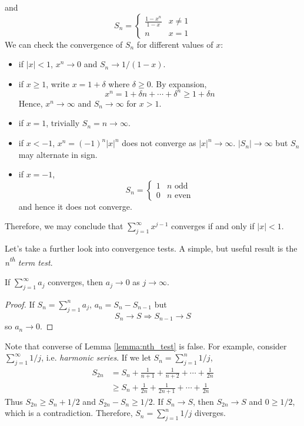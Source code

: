 \documentclass[10pt, a4paper, twoside]{report}
\begin{document}
and 
\[S_n=\begin{cases}
    \frac{1-x^n}{1-x} & x\neq 1 \\
    n & x=1
\end{cases}\]
We can check the convergence of \(S_n\) for different values of \(x\):
\begin{itemize}
    \item if \(|x|<1\), \(x^n\to 0\) and \(S_n\to 1/(1-x)\). 
    \item if \(x\geq 1\), write \(x=1+\delta\) where \(\delta\geq 0\). By expansion,
    \[x^n=1+\delta n+\cdots+\delta^n\geq 1+\delta n\]
    Hence, \(x^n\to\infty\) and \(S_n\to\infty\) for \(x>1\).
    \item if \(x=1\), trivially \(S_n=n\to\infty\).
    \item if \(x<-1\), \(x^n=(-1)^n|x|^n\) does not converge as \(|x|^n\to\infty\). \(|S_n|\to\infty\) but \(S_n\) may alternate in sign.
    \item if \(x=-1\), 
    \[S_n=\begin{cases}
        1 & n\text{ odd} \\
        0 & n\text{ even}
    \end{cases}\]
    and hence it does not converge.
\end{itemize}
Therefore, we may conclude that \(\sum_{j=1}^{\infty}x^{j-1}\) converges if and only if \(|x|<1\).

Let's take a further look into convergence tests. A simple, but useful result is the \emph{n{\textsuperscript{th}} term test}.
\begin{lemma}
    If \(\sum_{j=1}^{\infty}a_j\) converges, then \(a_j\to 0\) as \(j\to\infty\).
    \label{lemma:nth_test}
\end{lemma}

\begin{proof}
    If \(S_n=\sum_{j=1}^{n}a_j\), \(a_n=S_n-S_{n-1}\) but
    \[S_n\to S\Rightarrow S_{n-1}\to S\]
    so \(a_n\to 0\).
\end{proof}
Note that converse of Lemma \ref{lemma:nth_test} is false. For example, consider \(\sum_{j=1}^{\infty}1/j\), i.e. \emph{harmonic series}. If we let \(S_n=\sum_{j=1}^{n}1/j\),
\begin{align*}
    S_{2n}&=S_n+\frac{1}{n+1}+\frac{1}{n+2}+\cdots +\frac{1}{2n} \\
    &\geq S_n+\frac{1}{2n}+\frac{1}{2n+1}+\cdots +\frac{1}{2n}
\end{align*}
Thus \(S_{2n}\geq S_n+1/2\) and \(S_{2n}-S_n\geq 1/2\). If \(S_n\to S\), then \(S_{2n}\to S\) and \(0\geq 1/2\), which is a contradiction. Therefore, \(S_n=\sum_{j=1}^{n}1/j\) diverges. 
\end{document}
